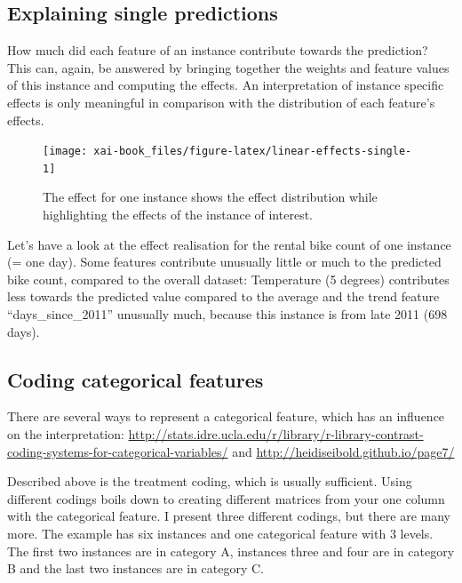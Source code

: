 \documentclass[12pt,]{krantz}
\theoremstyle{definition}
\theoremstyle{definition}
\theoremstyle{definition}
\theoremstyle{remark}
\begin{document}
\subsection{Explaining single
predictions}\label{explaining-single-predictions}

How much did each feature of an instance contribute towards the
prediction? This can, again, be answered by bringing together the
weights and feature values of this instance and computing the effects.
An interpretation of instance specific effects is only meaningful in
comparison with the distribution of each feature's effects.

\begin{figure}

{\centering \texttt{[image: xai-book\_files/figure-latex/linear-effects-single-1]} 

}

\caption{The effect for one instance shows the effect distribution while highlighting the effects of the instance of interest.}\label{fig:linear-effects-single}
\end{figure}

Let's have a look at the effect realisation for the rental bike count of
one instance (= one day). Some features contribute unusually little or
much to the predicted bike count, compared to the overall dataset:
Temperature (5 degrees) contributes less towards the predicted value
compared to the average and the trend feature ``days\_since\_2011''
unusually much, because this instance is from late 2011 (698 days).

\subsection{Coding categorical features}\label{cat.code}

There are several ways to represent a categorical feature, which has an
influence on the interpretation:
\url{http://stats.idre.ucla.edu/r/library/r-library-contrast-coding-systems-for-categorical-variables/}
and \url{http://heidiseibold.github.io/page7/}

Described above is the treatment coding, which is usually sufficient.
Using different codings boils down to creating different matrices from
your one column with the categorical feature. I present three different
codings, but there are many more. The example has six instances and one
categorical feature with 3 levels. The first two instances are in
category A, instances three and four are in category B and the last two
instances are in category C.
\end{document}
